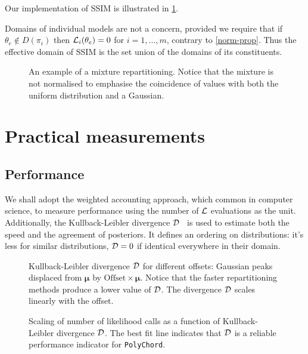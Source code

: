 \documentclass[usenatbib]{mnras}
\begin{document}
Our implementation of SSIM is illustrated in \cref{fig:mixture}.

Domains of individual models are not a concern, provided we require
that if $\theta_{e} \not\in D(\pi_{i})$ then
${\cal L}_{i}(\theta_{e})=0$ for $i=1,\ldots,m$, contrary to
\cref{norm-prop}. Thus the effective domain of SSIM is the set union
of the domains of its constituents.

\begin{figure}
 
\caption{An example of a mixture repartitioning. Notice that the mixture is not normalised to emphasise the coincidence of values with both the uniform distribution and a Gaussian.\label{fig:mixture}}
\end{figure}



\section{Practical measurements}
\subsection{Performance}
We shall adopt the weighted accounting approach, which common in
computer science, to measure performance using the number of
\({\cal L}\) evaluations as the unit. Additionally, the
Kullback-Leibler divergence \({\cal D}\)~\cite[see]{Kullback_1951} is
used to estimate both the speed and the agreement of posteriors. It
defines an ordering on distributions: it's less for similar
distributions, ${\cal D}=0$ if identical everywhere in their domain.

\begin{figure}
  
\caption{Kullback-Leibler divergence \({\cal D}\) for different offsets: Gaussian peaks displaced from \(\bm{\mu}\) by \(\text{Offset}\times \bm{\mu}\). Notice that the faster repartitioning methods produce a lower value of \({\cal D}\). The divergence \({\cal D}\) scales linearly with the offset.\label{fig:kl-d}}
\end{figure}

\begin{figure}
  
\caption{Scaling of number of likelihood calls as a function of Kullback-Leibler divergence \({\cal D}\). The best fit line indicates that \({\cal D}\) is a reliable performance indicator for \texttt{PolyChord}.\label{fig:kl-scaling}}
\end{figure}
\end{document}

